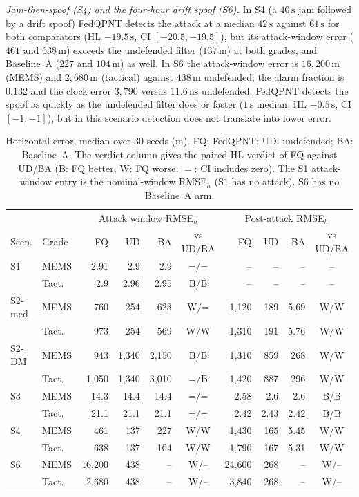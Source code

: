 \documentclass[journal]{IEEEtran}
\begin{document}
\emph{Jam-then-spoof (S4) and the four-hour drift spoof (S6).} In S4 (a $40\,\mathrm{s}$ jam followed by a drift spoof) FedQPNT detects the attack at a median $42\,\mathrm{s}$ against $61\,\mathrm{s}$ for both comparators (HL $-19.5\,\mathrm{s}$, CI $[-20.5,-19.5]$), but its attack-window error ($461$ and $638\,\mathrm{m}$) exceeds the undefended filter ($137\,\mathrm{m}$) at both grades, and Baseline~A ($227$ and $104\,\mathrm{m}$) as well. In S6 the attack-window error is $16{,}200\,\mathrm{m}$ (MEMS) and $2{,}680\,\mathrm{m}$ (tactical) against $438\,\mathrm{m}$ undefended; the alarm fraction is $0.132$ and the clock error $3{,}790$ versus $11.6\,\mathrm{ns}$ undefended. FedQPNT detects the spoof as quickly as the undefended filter does or faster ($1\,\mathrm{s}$ median; HL $-0.5\,\mathrm{s}$, CI $[-1,-1]$), but in this scenario detection does not translate into lower error.

\begin{table}[t]
\centering
\caption{Horizontal error, median over $30$ seeds (m). FQ: FedQPNT; UD: undefended; BA: Baseline~A. The verdict column gives the paired HL verdict of FQ against UD/BA (B: FQ better; W: FQ worse; $=$: CI includes zero). The S1 attack-window entry is the nominal-window RMSE$_h$ (S1 has no attack). S6 has no Baseline~A arm.}
\label{tab:head1}
\scriptsize
\setlength{\tabcolsep}{3pt}
\begin{tabular}{llrrrcrrrc}
\toprule
 & & \multicolumn{4}{c}{Attack window RMSE$_h$} & \multicolumn{4}{c}{Post-attack RMSE$_h$} \\
\cmidrule(lr){3-6}\cmidrule(lr){7-10}
Scen. & Grade & FQ & UD & BA & vs UD/BA & FQ & UD & BA & vs UD/BA \\
\midrule
S1 & MEMS & 2.91 & 2.9 & 2.9 & =/= & -- & -- & -- & -- \\
 & Tact. & 2.9 & 2.96 & 2.95 & B/B & -- & -- & -- & -- \\
S2-med & MEMS & 760 & 254 & 623 & W/= & 1{,}120 & 189 & 5.69 & W/W \\
 & Tact. & 973 & 254 & 569 & W/W & 1{,}310 & 191 & 5.76 & W/W \\
S2-DM & MEMS & 943 & 1{,}340 & 2{,}150 & B/B & 1{,}310 & 859 & 268 & W/W \\
 & Tact. & 1{,}050 & 1{,}340 & 3{,}010 & =/B & 1{,}420 & 887 & 296 & W/W \\
S3 & MEMS & 14.3 & 14.4 & 14.4 & =/= & 2.58 & 2.6 & 2.6 & B/B \\
 & Tact. & 21.1 & 21.1 & 21.1 & =/= & 2.42 & 2.43 & 2.42 & B/B \\
S4 & MEMS & 461 & 137 & 227 & W/W & 1{,}430 & 165 & 5.45 & W/W \\
 & Tact. & 638 & 137 & 104 & W/W & 1{,}790 & 167 & 5.31 & W/W \\
S6 & MEMS & 16{,}200 & 438 & -- & W/-- & 24{,}600 & 268 & -- & W/-- \\
 & Tact. & 2{,}680 & 438 & -- & W/-- & 3{,}840 & 268 & -- & W/-- \\
\bottomrule
\end{tabular}
\end{table}
\end{document}
